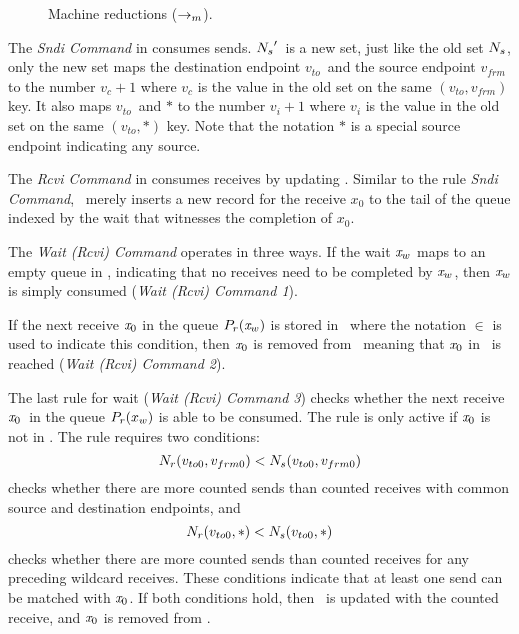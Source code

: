 \begin{figure*}[tb]
{}
\caption{Machine reductions ($\rightarrow_{m}$). }
\label{fig:machine}
\end{figure*}

The \emph{Sndi Command} in  consumes sends. 
$\textit{$N_s$}^\prime$\ is a new set, just like the old set $\textit{$N_s$}$, only the new set maps the destination
endpoint $v_{to}$\ and the source endpoint $v_{frm}$ to the number $v_c + 1$ where $v_c$ is the value in the old set on the same $(v_{to},v_{frm})$ key. 
It also maps $v_{to}$\ and $\ast$ to the number $v_i + 1$ where $v_i$ is the value in the old set on the same $(v_{to},\ast)$ key. Note that the notation $\ast$ is a special source endpoint indicating any source.

The \emph{Rcvi Command} in  consumes receives by updating \epwait. 
Similar to the rule \emph{Sndi Command}, \epwait\ merely inserts a new record for the receive $x_0$ to the tail of the queue indexed by the 
wait that witnesses the completion of $x_0$.

The \emph{Wait (Rcvi) Command} operates in three ways. 
If the wait $\mathit{x}_w$ maps to an empty queue in \epwait, indicating that no receives need to be completed by $\mathit{x}_w$, then $\mathit{x}_w$ is simply consumed (\emph{Wait (Rcvi) Command 1}). 

If the next receive $\mathit{x}_0$ in the queue $\textit{$P_r$}(\mathit{x}_w)$ is stored in \rcvp\ where the notation $\in$ is used to indicate this condition, then $\mathit{x}_0$ is removed from \rcvp\ meaning that $\mathit{x}_0$ in \rcvp\ is reached (\emph{Wait (Rcvi) Command 2}). 

The last rule for wait (\emph{Wait (Rcvi) Command 3}) checks whether the next receive $\mathit{x}_0$\ in the queue $\textit{$P_r$}(x_w)$ is able to be consumed. The rule is only active if $\mathit{x}_0$ is not in \rcvp. The rule requires two conditions: 
\[\textit{$N_r$}(v_{to0},v_{frm0}) < \textit{$N_s$}(v_{to0},v_{frm0})\]
checks whether there are more counted sends than counted receives with common source and destination endpoints,
and 
\[\textit{$N_r$}(v_{to0},\ast) < \textit{$N_s$}(v_{to0},\ast)\]
checks whether there are more counted sends than counted receives for any preceding wildcard receives. These conditions indicate that at least one send can be matched with $\mathit{x}_0$. If both conditions hold, then \eprcv\ is updated with the counted receive, and $\mathit{x}_0$ is removed from \epwait. 

